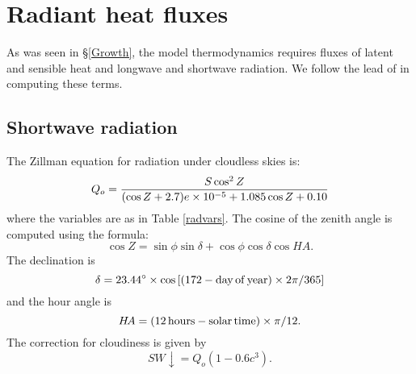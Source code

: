 \section{Radiant heat fluxes}
\label{shortwave}

As was seen in \S\ref{Growth}, the model thermodynamics requires
fluxes of latent and sensible heat and longwave and shortwave
radiation.  We follow the lead of
\citet{Parkinson} in computing these terms.

\subsection{Shortwave radiation}

The Zillman equation for radiation under cloudless skies is:
\begin{equation}
   Q_o = {S \cos^2 Z \over (\cos Z + 2.7) e \times 10^{-5} + 1.085
   \cos Z + 0.10}
\end{equation}
where the variables are as in Table \ref{radvars}.  The cosine of the
zenith angle is computed using the formula:
\begin{equation}
   \cos Z = \sin \phi \sin \delta + \cos \phi \cos \delta \cos H\!A .
\end{equation}
The declination is 
\begin{equation}
   \delta = 23.44^{\circ} \times \cos \left[ (172 - {\rm day \, of \, year})
   \times 2 \pi / 365 \right]
\end{equation}
and the hour angle is
\begin{equation}
   H\!A = (12 \, {\rm hours - solar \, time}) \times \pi / 12 .
\end{equation}
The correction for cloudiness is given by
\begin{equation}
   SW\!\!\downarrow = Q_o ( 1 - 0.6 c^3) .
\end{equation}

